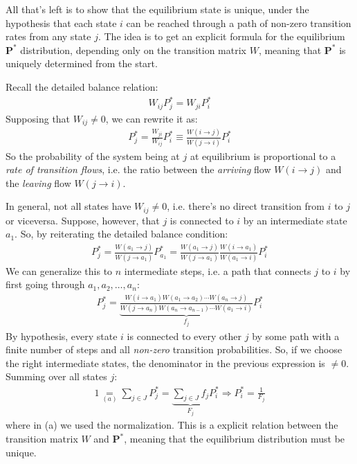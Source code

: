 \documentclass[../template.tex]{subfiles}
\begin{document}
\begin{exo}
\begin{enumerate}
        All that's left is to show that the equilibrium state is unique, under the hypothesis that each state $i$ can be reached through a path of non-zero transition rates from any state $j$.
        The idea is to get an explicit formula for the equilibrium $\bm{P^*}$ distribution, depending only on the transition matrix $W$, meaning that $\bm{P^*}$ is uniquely determined from the start.

        Recall the detailed balance relation:
        \begin{align*}
            W_{ij} P_{j}^* = W_{ji} P_i^*
        \end{align*}
        Supposing that $W_{ij} \neq 0$, we can rewrite it as:
        \begin{align*}
            P_j^* = \frac{W_{ji}}{W_{ij}} P_i^* \equiv \frac{W(i \to j)}{W(j \to i)} P_i^*
        \end{align*}
        So the probability of the system being at $j$ at equilibrium is proportional to a \textit{rate of transition flows}, i.e. the ratio between the \textit{arriving} flow $W(i \to j)$ and the \textit{leaving} flow $W(j \to i)$.
        
        In general, not all states have $W_{ij} \neq 0$, i.e. there's no direct transition from $i$ to $j$ or viceversa. Suppose, however, that $j$ is connected to $i$ by an intermediate state $a_1$. So, by reiterating the detailed balance condition:
        \begin{align*}
            P_j^* = \frac{W(a_1 \to j )}{W(j \to a_1)} P_{a_1}^* = \frac{W(a_1 \to j )}{W(j \to a_1)} \frac{W(i \to a_1)}{W(a_1 \to i)} P_i^* 
        \end{align*}
        We can generalize this to $n$ intermediate steps, i.e. a path that connects $j$ to $i$ by first going through $a_1, a_2, \dots, a_n$:
        \begin{align*}
            P_j^* = \underbrace{\frac{W(i \to a_1 ) W(a_1 \to a_2 ) \cdots W(a_n \to j)}{W(j \to a_n) W(a_n \to a_{n-1} ) \cdots W(a_1 \to i)}}_{f_j} P_i^*
        \end{align*}
        By hypothesis, every state $i$ is connected to every other $j$ by some path with a finite number of steps and all \textit{non-zero} transition probabilities. So, if we choose the right intermediate states, the denominator in the previous expression is $\neq 0$.
        Summing over all states $j$:
        \begin{align*}
            1 \underset{(a)}{=}  \sum_{j \in J} P_j^* = \underbrace{\sum_{j \in J} f_j}_{F_j}  P_i^* \Rightarrow P_i^* = \frac{1}{F_j} 
        \end{align*}
        where in (a) we used the normalization. This is a explicit relation between the transition matrix $W$ and $\bm{P}^*$, meaning that the equilibrium distribution must be unique.
    \end{enumerate}
\end{exo}
\end{document}
